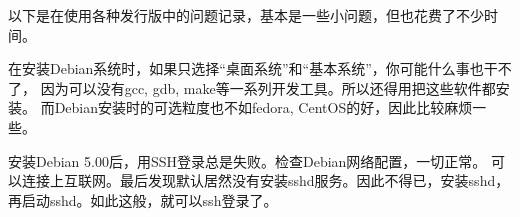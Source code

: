 以下是在使用各种发行版中的问题记录，基本是一些小问题，但也花费了不少时间。

 在安装Debian系统时，如果只选择“桌面系统”和“基本系统”，你可能什么事也干不了，
因为可以没有gcc, gdb, make等一系列开发工具。所以还得用把这些软件都安装。
而Debian安装时的可选粒度也不如fedora, CentOS的好，因此比较麻烦一些。

 安装Debian 5.00后，用SSH登录总是失败。检查Debian网络配置，一切正常。
可以连接上互联网。最后发现默认居然没有安装sshd服务。因此不得已，安装sshd，
再启动sshd。如此这般，就可以ssh登录了。
